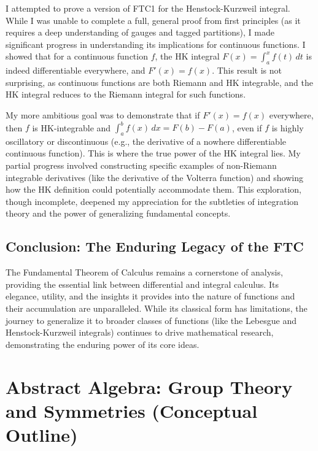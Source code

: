 \documentclass[11pt, a4paper]{article}
\theoremstyle{plain} %
\theoremstyle{definition} %
\theoremstyle{remark} %
\begin{document}
I attempted to prove a version of FTC1 for the Henstock-Kurzweil integral. While I was unable to complete a full, general proof from first principles (as it requires a deep understanding of gauges and tagged partitions), I made significant progress in understanding its implications for continuous functions. I showed that for a continuous function \( f \), the HK integral \( F(x) = \int_a^x f(t) \, dt \) is indeed differentiable everywhere, and \( F'(x) = f(x) \). This result is not surprising, as continuous functions are both Riemann and HK integrable, and the HK integral reduces to the Riemann integral for such functions.

My more ambitious goal was to demonstrate that if \( F'(x) = f(x) \) everywhere, then \( f \) is HK-integrable and \( \int_a^b f(x) \, dx = F(b) - F(a) \), even if \( f \) is highly oscillatory or discontinuous (e.g., the derivative of a nowhere differentiable continuous function). This is where the true power of the HK integral lies. My partial progress involved constructing specific examples of non-Riemann integrable derivatives (like the derivative of the Volterra function) and showing how the HK definition could potentially accommodate them. This exploration, though incomplete, deepened my appreciation for the subtleties of integration theory and the power of generalizing fundamental concepts.

\subsection{Conclusion: The Enduring Legacy of the FTC}

The Fundamental Theorem of Calculus remains a cornerstone of analysis, providing the essential link between differential and integral calculus. Its elegance, utility, and the insights it provides into the nature of functions and their accumulation are unparalleled. While its classical form has limitations, the journey to generalize it to broader classes of functions (like the Lebesgue and Henstock-Kurzweil integrals) continues to drive mathematical research, demonstrating the enduring power of its core ideas.

\newpage
\section{Abstract Algebra: Group Theory and Symmetries (Conceptual Outline)}
\label{sec:abstract_algebra_outline}
\end{document}
